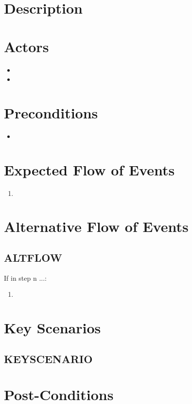\documentclass{scrreprt}
\begin{document}
\section{Description}

\section{Actors}
\begin{itemize}
    \item 
    \item 
\end{itemize}

\section{Preconditions}
\begin{itemize}
    \item 
\end{itemize}

\section{Expected Flow of Events}
\begin{enumerate}[1.]
    \item 
\end{enumerate}

\section{Alternative Flow of Events}

    \subsection{ALTFLOW}
    If in step n ...:
    \begin{enumerate}
        \item 
    \end{enumerate}

\section{Key Scenarios}
    \subsection{KEYSCENARIO}

\section{Post-Conditions}
\end{document}

